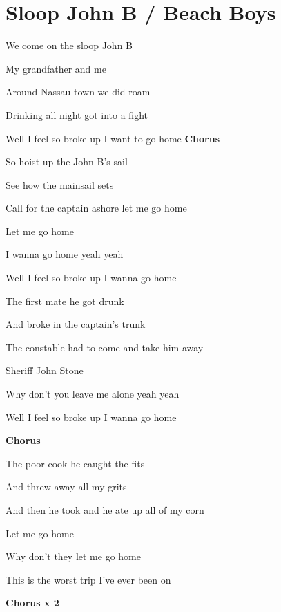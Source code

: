 \section{Sloop John B / Beach Boys}\label{sec:sloop_john_b}

  \Cmajor
  \Gseven
  \Dseven
  \Aminor
  
   We come on the sloop John B
  
  My grandfather and me
  
  Around Nassau town we did  roam
  
  Drinking all  night  got into a  fight 
  
  Well I  feel so broke up  I want to go  home
  \textbf{Chorus}
  
   So hoist up the John B’s sail
  
  See how the mainsail sets
  
  Call for the captain ashore let me go  home
  
  Let me go  home 
  
  I wanna go  home yeah  yeah
  
  Well I  feel so broke up  I wanna go  home
  
   The first mate he got drunk
  
  And broke in the captain’s trunk
  
  The constable had to come and take him away
  
  Sheriff John  Stone 
  
  Why don’t you leave me alone yeah  yeah
  
  Well I  feel so broke up  I wanna go  home
  
  \textbf{Chorus}
  
   The poor cook he caught the fits
  
  And threw away all my grits
  
  And then he took and he ate up all of my  corn
  
  Let me go  home 
  
  Why don’t they let me go  home 
  
  This  is the worst trip  I’ve ever been  on
  
  \textbf{Chorus x 2}
